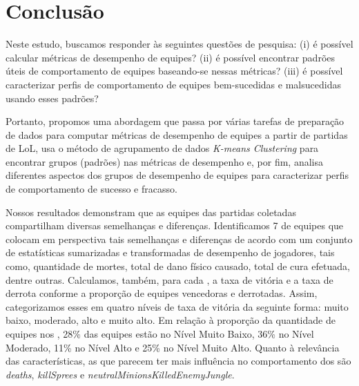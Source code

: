 \chapter{Conclusão}
Neste estudo, buscamos responder às seguintes questões de pesquisa: (i) é possível calcular métricas de desempenho de equipes? (ii) é possível encontrar padrões úteis de comportamento de equipes baseando-se nessas métricas? (iii) é possível caracterizar perfis de comportamento de equipes bem-sucedidas e malsucedidas usando esses padrões?

Portanto, propomos uma abordagem que passa por várias tarefas de preparação de dados para computar métricas de desempenho de equipes a partir de partidas de LoL, usa o método de agrupamento de dados \textit{K-means Clustering} para encontrar grupos (padrões) nas métricas de desempenho e, por fim, analisa diferentes aspectos dos grupos de desempenho de equipes para caracterizar perfis de comportamento de sucesso e fracasso.

Nossos resultados demonstram que as equipes das partidas coletadas compartilham diversas semelhanças e diferenças. Identificamos 7   de equipes que colocam em perspectiva tais semelhanças e diferenças de acordo com um conjunto de estatísticas sumarizadas e transformadas de desempenho de jogadores, tais como, quantidade de mortes, total de dano físico causado, total de cura efetuada, dentre outras. Calculamos, também, para cada , a taxa de vitória e a taxa de derrota conforme a proporção de equipes vencedoras e derrotadas. Assim, categorizamos esses  em quatro níveis de taxa de vit\'oria da seguinte forma: muito baixo, moderado, alto e muito alto. Em relação à proporção da quantidade de equipes nos , 28\% das equipes estão no Nível Muito Baixo, 36\% no Nível Moderado, 11\% no Nível Alto e 25\% no Nível Muito Alto. Quanto à relevância das características, as que parecem ter mais influência no comportamento dos  são \textit{deaths}, \textit{killSprees} e \textit{neutralMinionsKilledEnemyJungle}.

